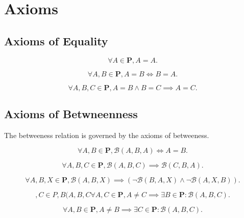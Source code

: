 \documentclass[../../../main/main.tex]{subfiles}
\begin{document}
\chapter{Axioms}

\section{Axioms of Equality}
\begin{axiom}
    \[
    \forall A \in \mathbf{P}, A = A.
    \]
\end{axiom}
\begin{axiom}
    \[
    \forall A, B \in \mathbf{P}, A = B \iff B = A.
    \]
\end{axiom}
\begin{axiom}
    \[
    \forall A, B, C \in \mathbf{P}, A = B \land B = C \implies A = C.
    \]
\end{axiom}

\section{Axioms of Betwneenness}
The betweeness relation is governed by the axioms of betweeness.
\begin{axiom}
    \[
    \forall A, B \in \mathbf{P}, \mathcal{B}(A, B, A) \iff A = B.
    \]
\end{axiom}
\begin{axiom}
    \[
    \forall A, B, C \in \mathbf{P}, \mathcal{B}(A, B, C) \implies \mathcal{B}(C, B, A).
    \]
\end{axiom}
\begin{axiom}
    \[
    \forall A, B, X \in \mathbf{P}, \mathcal{B}(A, B, X) \implies (\neg \mathcal{B}(B, A, X) \land \neg \mathcal{B}(A, X, B)).
    \]
\end{axiom}
\begin{axiom}
    \[, C ∈ P, B(A, B, C
    \forall A, C \in \mathbf{P}, A \neq C \implies \exists B \in \mathbf{P} \colon \mathcal{B}(A, B, C).
    \]
\end{axiom}
\begin{axiom}
    \[
    \forall A, B \in \mathbf{P}, A \neq B \implies \exists C \in \mathbf{P} \colon \mathcal{B}(A, B, C).
    \]
\end{axiom}
\end{document}
